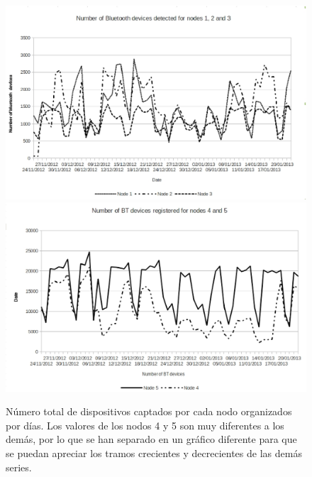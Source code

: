 \documentclass[runningheads]{llncs}
\begin{document}
\begin{figure}[htb]
 \begin{center}
\includegraphics[scale=0.6]{number-of-bt-devices-detected-1-2-3.eps} 
\includegraphics[scale=0.6]{number-of-bt-devices-detected-4-5.eps}
 \caption{Número total de dispositivos captados por cada nodo organizados por días. Los valores
de los nodos 4 y 5 son muy diferentes a los demás, por lo que se han separado en un gráfico
diferente para que se puedan apreciar los tramos crecientes y decrecientes de las
demás series.
 \label{fig:collected-data}}
 \end{center}
 \end{figure}
\end{document}
